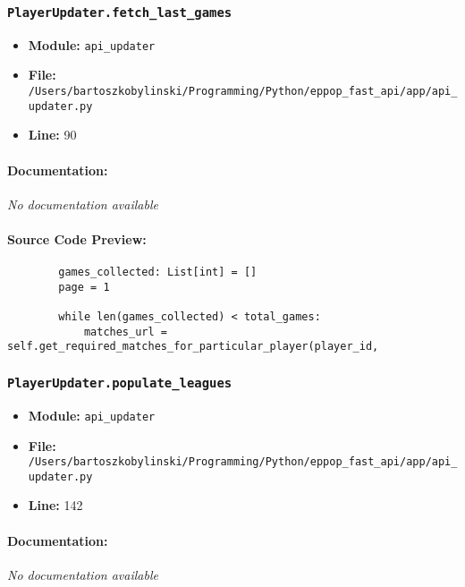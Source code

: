 \documentclass[11pt,a4paper]{article}
\begin{document}
\vspace{1em}
\subsubsection{\texttt{PlayerUpdater.fetch\_last\_games}}

\begin{itemize}
    \item \textbf{Module:} \texttt{api\_updater}
    \item \textbf{File:} \texttt{/Users/bartoszkobylinski/Programming/Python/eppop\_fast\_api/app/api\_updater.py}
    \item \textbf{Line:} 90
\end{itemize}

\paragraph{Documentation:} \textit{No documentation available}

\paragraph{Source Code Preview:}
\begin{verbatim}
        games_collected: List[int] = []
        page = 1

        while len(games_collected) < total_games:
            matches_url = self.get_required_matches_for_particular_player(player_id,
\end{verbatim}

\vspace{1em}
\subsubsection{\texttt{PlayerUpdater.populate\_leagues}}

\begin{itemize}
    \item \textbf{Module:} \texttt{api\_updater}
    \item \textbf{File:} \texttt{/Users/bartoszkobylinski/Programming/Python/eppop\_fast\_api/app/api\_updater.py}
    \item \textbf{Line:} 142
\end{itemize}

\paragraph{Documentation:} \textit{No documentation available}
\end{document}

